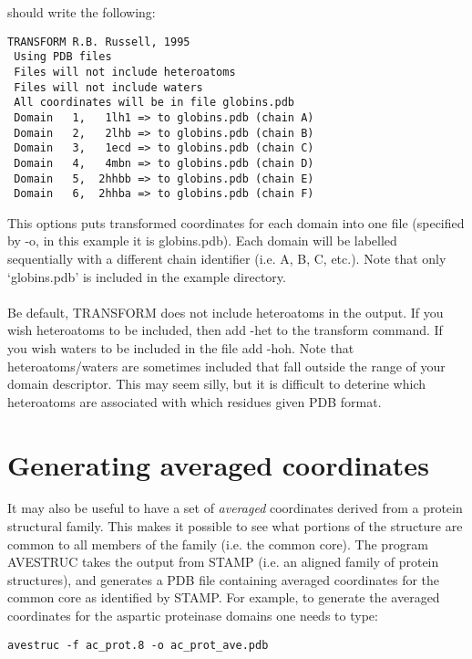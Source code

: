 should write the following:\\

\begin{scriptsize}\begin{verbatim}
TRANSFORM R.B. Russell, 1995
 Using PDB files
 Files will not include heteroatoms
 Files will not include waters
 All coordinates will be in file globins.pdb
 Domain   1,   1lh1 => to globins.pdb (chain A)
 Domain   2,   2lhb => to globins.pdb (chain B)
 Domain   3,   1ecd => to globins.pdb (chain C)
 Domain   4,   4mbn => to globins.pdb (chain D)
 Domain   5,  2hhbb => to globins.pdb (chain E)
 Domain   6,  2hhba => to globins.pdb (chain F)
\end{verbatim} \end{scriptsize}

This options puts transformed coordinates for each domain into one file
(specified by -o, in this example it is globins.pdb).  Each domain will 
be labelled sequentially with a different chain identifier (i.e. A, B, C,
etc.).  Note that only `globins.pdb' is included in the example directory.\\
\\
Be default, TRANSFORM does not include heteroatoms in the output.  If you 
wish heteroatoms to be included, then add -het to the transform command.  
If you wish waters to be included in the file add -hoh.
Note that heteroatoms/waters are sometimes included that fall outside the
range of your domain descriptor.  This may seem silly, but it
is difficult to deterine which heteroatoms are associated with which residues
given PDB format.

\section{Generating averaged coordinates}

It may also be useful to have a set of {\em averaged} coordinates derived 
from a protein structural family.  This makes it possible to see what 
portions of the structure are common to all members of the family (i.e. 
the common core).  The program AVESTRUC takes the output from STAMP 
(i.e. an aligned family of protein structures), and generates a PDB file 
containing averaged coordinates for the common core as identified by 
STAMP.  For example, to generate the averaged coordinates for the 
aspartic proteinase domains one needs to type:\\

\begin{scriptsize}\begin{verbatim}
avestruc -f ac_prot.8 -o ac_prot_ave.pdb
\end{verbatim} \end{scriptsize}

